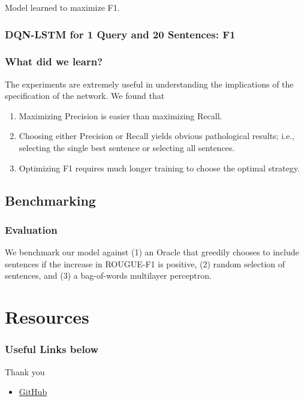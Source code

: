 \documentclass[]{beamer}
\begin{document}
		\begin{frame}
			Model learned to maximize F1.
			\frametitle{DQN-LSTM for 1 Query and 20 Sentences: F1}
			\begin{center}
			\end{center}
		\end{frame}

		\begin{frame}
			\frametitle{What did we learn?}
			The experiments are extremely useful in understanding the implications of the specification of the network. We found that 
			\begin{center}
				\begin{enumerate}
					\item<1-> Maximizing Precision is easier than maximizing Recall.
					\item<1-> Choosing either Precision or Recall yields obvious pathological results; i.e., selecting the single best sentence or selecting all sentences.
					\item<1-> Optimizing F1 requires much longer training to choose the optimal strategy.
				\end{enumerate}
			\end{center}
		\end{frame}

	\subsection{Benchmarking}
		\begin{frame}
			\frametitle{Evaluation}
		We benchmark our model against (1) an Oracle that greedily chooses to include sentences if the increase in ROUGUE-F1 is positive,  (2) random selection of sentences,  and (3) a bag-of-words multilayer perceptron.
		\end{frame}



\section{Resources}
\begin{frame}
	\frametitle{Useful Links below}
	Thank you
	\begin{itemize}
	\item<1-> \href{https://github.com/franciscojavierarceo/DQN-Event-Summarization}{GitHub}
	\end{itemize}
\end{frame}


\end{document}
